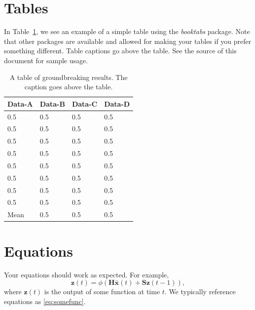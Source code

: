\documentclass[master]{thesis}
\newcommand{\tref}[1]{Table~\ref{#1}}    %
\begin{document}
\section{Tables}

In \tref{table:sample}, we see an example of a simple table using the \textit{booktabs} package.  Note that other packages are available and allowed for making your tables if you prefer something different.  Table captions go above the table.  See the source of this document for sample usage.

\begin{table}[hp]
    \caption[Sample table.]{A table of groundbreaking results.  The caption goes above the table.}
    \label{table:sample}

    \begin{center}
        \begin{tabular}{@{}*{4}{l}} %
            \toprule %
            Data-A  & Data-B    & Data-C    & Data-D \\
            \midrule %
            0.5     & 0.5       & 0.5       & 0.5   \\
            0.5     & 0.5       & 0.5       & 0.5   \\
            0.5     & 0.5       & 0.5       & 0.5   \\
            0.5     & 0.5       & 0.5       & 0.5   \\
            0.5     & 0.5       & 0.5       & 0.5   \\
            0.5     & 0.5       & 0.5       & 0.5   \\
            0.5     & 0.5       & 0.5       & 0.5   \\
            0.5     & 0.5       & 0.5       & 0.5   \\
            \midrule
            Mean    & 0.5       & 0.5       & 0.5   \\
            \bottomrule %
        \end{tabular}
    \end{center}
\end{table}

\section{Equations}

Your equations should work as expected.  For example,
\begin{equation}
    \mathbf{z}(t) = \phi(\mathbf{H} \bar{\mathbf{x}}(t) + \mathbf{S} \mathbf{z}(t-1)),
    \label{eq:somefunc}
\end{equation}
where $\mathbf{z}(t)$ is the output of some function at time $t$.  We typically reference equations as \eqref{eq:somefunc}.
\end{document}
